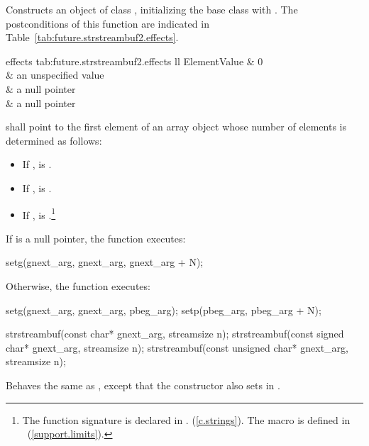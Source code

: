 \begin{itemdescr}
\pnum
\effects
Constructs an object of class
,
initializing the base class with
.
The postconditions of this function are indicated in Table~\ref{tab:future.strstreambuf2.effects}.

\begin{libtab2}{ effects}
{tab:future.strstreambuf2.effects}
{ll}
{Element}{Value}
	&	0						\\
	&	an unspecified value	\\
	&	a null pointer			\\
	&	a null pointer			\\
\end{libtab2}

\pnum
{} shall point to the first element of an array
object whose number of elements  is determined as follows:
\begin{itemize}
\item
If
,
 is .
\item
If
,
 is
.
%
\item
If
,
 is
.\footnote{The function signature
is declared in
.
%
%
(\ref{c.strings}).
The macro
is defined in
~(\ref{support.limits}).
}
\end{itemize}

\pnum
If  is a null pointer, the function executes:

%
%
\begin{itemdecl}
setg(gnext_arg, gnext_arg, gnext_arg + N);
\end{itemdecl}

\pnum
Otherwise, the function executes:

\begin{codeblock}
setg(gnext_arg, gnext_arg, pbeg_arg);
setp(pbeg_arg,  pbeg_arg + N);

strstreambuf(const char* gnext_arg, streamsize n);
strstreambuf(const signed char* gnext_arg, streamsize n);
strstreambuf(const unsigned char* gnext_arg, streamsize n);
\end{codeblock}

\pnum
\effects
Behaves the same as
,
except that the constructor also sets  in .
\end{itemdescr}

